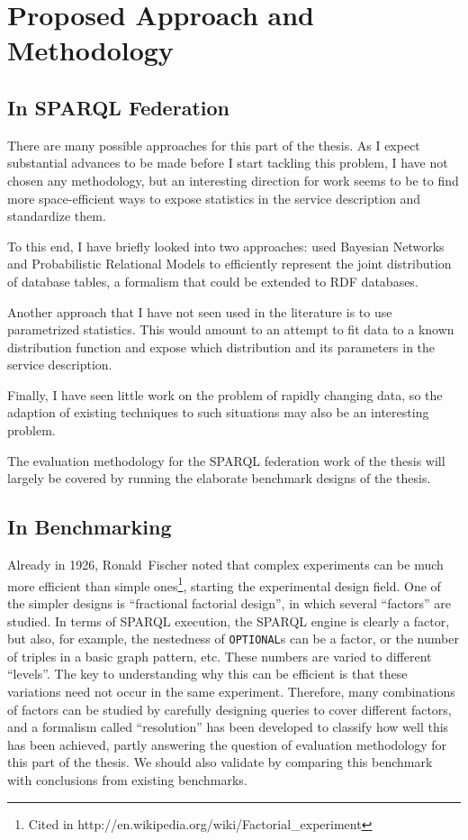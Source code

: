 \documentclass{llncs}
\begin{document}
\section{Proposed Approach and Methodology}

\subsection{In SPARQL Federation}

There are many possible approaches for this part of the thesis. As I
expect substantial advances to be made before I start tackling this
problem, I have not chosen any methodology, but an interesting
direction for work seems to be to find more space-efficient ways to
expose statistics in the service description and standardize them.

To this end, I have briefly looked into two approaches:
\cite{Getoor:2001:SEU:375663.375727} used Bayesian Networks and
Probabilistic Relational Models to efficiently represent the joint
distribution of database tables, a formalism that could be extended to
RDF databases.

Another approach that I have not seen used in the literature is to use
parametrized statistics. This would amount to an attempt to fit data to
a known distribution function and expose which distribution and its
parameters in the service description.

Finally, I have seen little work on the problem of rapidly changing
data, so the adaption of existing techniques to such situations may
also be an interesting problem.

The evaluation methodology for the SPARQL federation work of the
thesis will largely be covered by running the elaborate benchmark
designs of the thesis.

\subsection{In Benchmarking}\label{sec:benchmethod}

Already in 1926, Ronald~Fischer noted that complex experiments can be
much more efficient than simple ones\footnote{Cited in
  http://en.wikipedia.org/wiki/Factorial\_experiment}, starting the
experimental design field. One of the simpler designs is ``fractional
factorial design'', in which several ``factors'' are studied. In terms
of SPARQL execution, the SPARQL engine is clearly a factor, but also,
for example, the nestedness of \texttt{OPTIONAL}s can be a factor, or
the number of triples in a basic graph pattern, etc. These numbers are
varied to different ``levels''. The key to understanding why this can
be efficient is that these variations need not occur in the same
experiment. Therefore, many combinations of factors can be studied by
carefully designing queries to cover different factors, and a
formalism called ``resolution'' has been developed to classify how
well this has been achieved, partly answering the question of
evaluation methodology for this part of the thesis. We should also
validate by comparing this benchmark with conclusions from existing
benchmarks.
\end{document}
